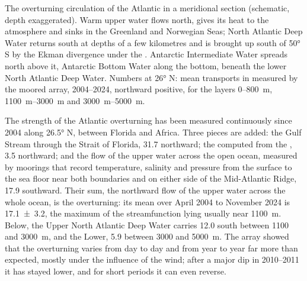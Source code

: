 \begin{omfigure}
{\small The overturning circulation of the Atlantic in a meridional section
(schematic, depth exaggerated). Warm upper water flows north, gives its heat to the
atmosphere and sinks in the Greenland and Norwegian Seas; North Atlantic Deep Water
returns south at depths of a few kilometres and is brought up south of \ang{50} S by
the Ekman divergence under the . Antarctic Intermediate Water spreads
north above it, Antarctic Bottom Water along the bottom, beneath the lower North
Atlantic Deep Water. Numbers at \ang{26} N: mean
transports in  measured by the moored array, 2004--2024, northward positive,
for the layers 0--\qty{800}{m}, \qtyrange{1100}{3000}{m} and
\qtyrange{3000}{5000}{m}.}
\label{fig:b1:ocean-circulation:moc}
\end{omfigure}

The strength of the Atlantic overturning has been measured continuously since 2004
along \ang{26.5} N, between Florida and Africa. Three pieces are added: the Gulf
Stream through the Strait of Florida, \qty{31.7}{\sverdrup} northward; the  computed from the , \qty{3.5}{\sverdrup} northward; and the
flow of the upper water across the open ocean, measured by moorings that record
temperature, salinity and pressure from the surface to the sea floor near both
boundaries and on either side of the Mid-Atlantic Ridge, \qty{17.9}{\sverdrup}
southward. Their sum, the northward flow of the upper water
across the whole ocean, is the overturning: its mean over April 2004 to November
2024 is \qty[uncertainty-mode=separate]{17.1 \pm 3.2}{\sverdrup}, the maximum of the
streamfunction lying usually near \qty{1100}{m}. Below, the Upper North Atlantic Deep
Water carries \qty{12.0}{\sverdrup} south between 1100 and \qty{3000}{m}, and the
Lower, \qty{5.9}{\sverdrup} between 3000 and \qty{5000}{m}. The array showed that the
overturning varies from day to day and from year to year far more than expected,
mostly under the influence of the wind; after a major dip in 2010--2011 it has stayed
lower, and for short periods it can even reverse.

